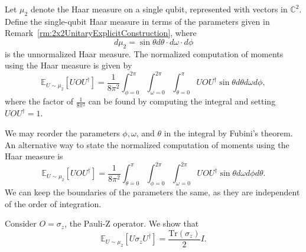 \begin{definition}\label{def:SingleQubitHaarMeasure}
    Let $\mu_{2}$ denote the Haar measure on a single qubit, represented with vectors in $\mathbb{C}^{2}$.
    Define the {single-qubit Haar measure} in terms of the parameters given in Remark~\ref{rm:2x2UnitaryExplicitConstruction}, where
    \begin{equation}
        d\mu_{2} = \sin{\theta} d\theta \cdot d\omega \cdot d\phi
    \end{equation}
    is the unnormalized Haar measure.
    The normalized computation of moments using the Haar measure is given by
    \begin{equation}\label{eq:NormalizedHaarMeas}
       \mathbb{E}_{U \sim \mu_{2}} [U O U^{\dagger}] = \frac{1}{8\pi^2} \int_{\phi = 0}^{2\pi} \int_{\omega = 0}^{2\pi} \int_{\theta = 0}^{\pi} U O U^{\dagger} \sin{\theta} d\theta d\omega d\phi,
    \end{equation}
    where the factor of $\frac{1}{8\pi^2}$ can be found by computing the integral and setting $UOU^{\dagger} =1$.
\end{definition}

\begin{remark}
    We may reorder the parameters $\phi, \omega$, and $\theta$ in the integral by Fubini's theorem.
    An alternative way to state the normalized computation of moments using the Haar measure is
    \begin{equation}
        \mathbb{E}_{U \sim \mu_{2}} [U O U^{\dagger}] = \frac{1}{8\pi^2} \int_{\theta = 0}^{\pi} \int_{\phi = 0}^{2\pi} \int_{\omega = 0}^{2\pi} U O U^{\dagger} \sin{\theta} d\omega d\phi d\theta.
    \end{equation}
    We can keep the boundaries of the parameters the same, as they are independent of the order of integration.
\end{remark}


\begin{theorem}
    Consider $O = \sigma_{z}$, the Pauli-Z operator.
    We show that
    \begin{equation}
        \mathbb{E}_{U \sim \mu_{2}} [U\sigma_{z}U^{\dagger}] = \frac{\text{Tr}(\sigma_{z})}{2} I.
    \end{equation}
\end{theorem}

